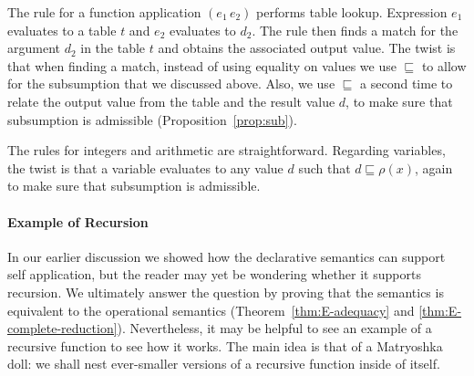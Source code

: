 \documentclass{tufte-handout}
\newcommand{\APP}[0]{\,}
\begin{document}
The rule for a function application $(e_1 \APP e_2)$ performs table
lookup. Expression $e_1$ evaluates to a table $t$ and $e_2$ evaluates
to $d_2$. The rule then finds a match for the argument $d_2$ in the
table $t$ and obtains the associated output value. The twist is that
when finding a match, instead of using equality on values we use
$\sqsubseteq$ to allow for the subsumption that we discussed above.
Also, we use $\sqsubseteq$ a second time to relate the output value
from the table and the result value $d$, to make sure that
subsumption is admissible (Proposition~\ref{prop:sub}).

The rules for integers and arithmetic are straightforward. Regarding
variables, the twist is that a variable evaluates to any value $d$
such that $d \sqsubseteq \rho(x)$, again to make sure that subsumption
is admissible.


\paragraph{Example of Recursion}

In our earlier discussion we showed how the declarative semantics can
support self application, but the reader may yet be wondering whether
it supports recursion. We ultimately answer the question by proving
that the semantics is equivalent to the operational semantics
(Theorem~\ref{thm:E-adequacy} and
\ref{thm:E-complete-reduction}). Nevertheless, it may be helpful to
see an example of a recursive function to see how it works.  The main
idea is that of a Matryoshka doll: we shall nest ever-smaller versions
of a recursive function inside of itself.
\end{document}
